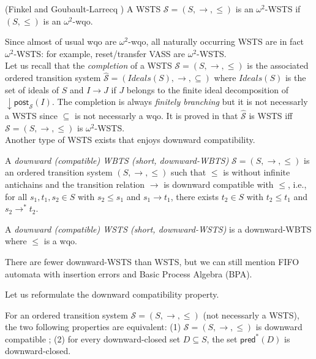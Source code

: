 \documentclass[runningheads]{llncs}
\newcommand{\pred}{\textsf{pred}}
\newcommand{\post}{\textsf{post}}
\begin{document}
\begin{definition}(Finkel and Goubault-Larrecq \cite{DBLP:journals/corr/abs-1208-4549})
A WSTS  $\mathscr{S}=(S, \rightarrow, \leq)$
is an $\omega^2$-WSTS if $(S, \leq)$ is an $\omega^2$-wqo.
\end{definition}
Since almost of usual wqo are $\omega^2$-wqo, all naturally occurring WSTS are in fact $\omega^2$-WSTS: for example, reset/transfer VASS are $\omega^2$-WSTS.\\

Let us recall that the \emph{completion}  \cite{BFM-ic17} of a WSTS $\mathscr{S}=(S,\rightarrow, \leq)$ is the associated ordered transition system $\hat{\mathscr{S}}=(Ideals(S),\rightarrow, \subseteq)$ where $Ideals(S)$ is the set of ideals of $S$ and $I \rightarrow J$ if $J$ belongs to the finite ideal decomposition of $\mathop{\downarrow} \post_{\mathscr{S}}(I)$. The completion is always \emph{finitely branching} but it is not necessarly a WSTS since $\subseteq$ is not necessarly a wqo. It is proved in  \cite{BFM-ic17} that $\hat{\mathscr{S}}$ is WSTS iff $\mathscr{S}=(S,\rightarrow, \leq)$ is $\omega^2$-WSTS. \\

Another type of WSTS exists that enjoys downward compatibility.
%
%
\begin{definition}
A {\em downward (compatible) WBTS (short, downward-WBTS)} $\mathscr{S}=(S, \rightarrow, \leq)$
is an ordered transition system $(S, \rightarrow, \leq)$ such that $\leq$ is without infinite antichains and
the transition relation $ \rightarrow$ is downward compatible with $\leq$, i.e., for all 
$s_1, t_1 , s_2 \in S$
	with $s_2 \leq s_1$  and $s_1 \rightarrow t_1$, there exists 
	$t_2 \in S$ with 
	$t_2 \leq t_1$ and $s_2 \rightarrow^{*} t_2$.

A  {\em downward (compatible) WSTS (short, downward-WSTS)} \cite[Definition 5.1]{DBLP:journals/tcs/FinkelS01} is a downward-WBTS where $\leq$ is a wqo.
\end{definition}

There are fewer downward-WSTS than WSTS, but we can still mention FIFO automata with insertion errors and Basic Process Algebra (BPA).

Let us reformulate the downward compatibility property.

\begin{lemma}\label{downward compatible}
For an ordered transition system $\mathscr{S}=(S, \rightarrow, \leq)$ (not necessarly a WSTS), the two following properties are equivalent: (1) $\mathscr{S}=(S, \rightarrow, \leq)$ is downward compatible ; (2) for every downward-closed set $D \subseteq S$, the set $\pred^*(D)$ is downward-closed.
\end{lemma}
\end{document}
